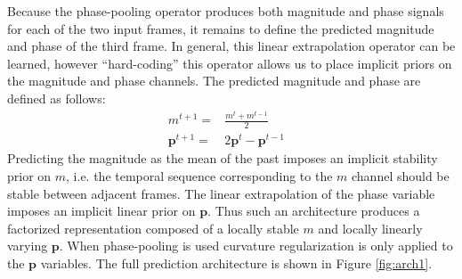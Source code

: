 Because the phase-pooling operator produces both magnitude and phase signals for each of the two input frames, it remains to define the predicted magnitude and phase of the third frame. In general, this linear extrapolation operator can be learned, however ``hard-coding'' this operator allows us to place implicit priors on the magnitude and phase channels. The predicted magnitude and phase are defined as follows: 
\begin{eqnarray}
m^{t+1}=&\frac{m^t + m^{t-1}}{2}&\\
\label{eqn:magpred} 
\mathbf p^{t+1}=&2\mathbf p^t-\mathbf p^{t-1}& 
\label{eqn:phasepred} 
\end{eqnarray} 
Predicting the magnitude as the mean of the past imposes an implicit stability prior on $m$, i.e. the temporal sequence corresponding to the $m$ channel should be stable between adjacent frames. The linear extrapolation of the phase variable imposes an implicit linear prior on $\mathbf p$. Thus such an architecture produces a factorized representation composed of a locally stable $m$ and locally linearly varying $\mathbf p$. When phase-pooling is used curvature regularization is only applied to the $\mathbf p$ variables. The full prediction architecture is shown in Figure \ref{fig:arch1}.  


